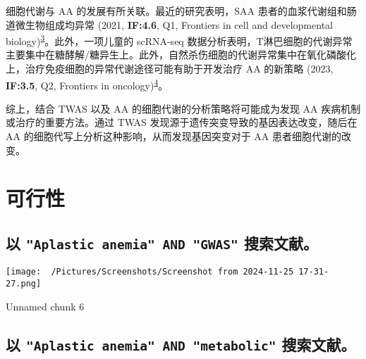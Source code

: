 \documentclass[
]{article}
\begin{document}
细胞代谢与 AA 的发展有所关联。最近的研究表明，SAA 患者的血浆代谢组和肠道微生物组成均异常 (2021, \textbf{IF:4.6}, Q1, Frontiers in cell and developmental biology)\textsuperscript{\protect\hyperlink{ref-Plasma_Metabolo_Shao_2021}{3}}。此外，一项儿童的 scRNA-seq 数据分析表明，T淋巴细胞的代谢异常主要集中在糖酵解/糖异生上。此外，自然杀伤细胞的代谢异常集中在氧化磷酸化上，治疗免疫细胞的异常代谢途径可能有助于开发治疗 AA 的新策略 (2023, \textbf{IF:3.5}, Q2, Frontiers in oncology)\textsuperscript{\protect\hyperlink{ref-Single_cell_RNA_Zhou_2023}{4}}。

综上，结合 TWAS 以及 AA 的细胞代谢的分析策略将可能成为发现 AA 疾病机制或治疗的重要方法。通过 TWAS 发现源于遗传突变导致的基因表达改变，随后在 AA 的细胞代写上分析这种影响，从而发现基因突变对于 AA 患者细胞代谢的改变。

\hypertarget{methods}{%
\section{可行性}\label{methods}}

\hypertarget{ux4ee5-aplastic-anemia-and-gwas-ux641cux7d22ux6587ux732e}{%
\subsection{\texorpdfstring{以 \texttt{"Aplastic\ anemia"\ AND\ "GWAS"} 搜索文献。}{以 "Aplastic anemia" AND "GWAS" 搜索文献。}}\label{ux4ee5-aplastic-anemia-and-gwas-ux641cux7d22ux6587ux732e}}

\begin{center}\vspace{1.5cm}\end{center}
\def\@captype{figure}
\begin{center}
\texttt{[image: ~/Pictures/Screenshots/Screenshot from 2024-11-25 17-31-27.png]}
\caption{Unnamed chunk 6}\label{fig:unnamed-chunk-6}
\end{center}

\begin{center}\vspace{1.5cm}\end{center}

\hypertarget{ux4ee5-aplastic-anemia-and-metabolic-ux641cux7d22ux6587ux732e}{%
\subsection{\texorpdfstring{以 \texttt{"Aplastic\ anemia"\ AND\ "metabolic"} 搜索文献。}{以 "Aplastic anemia" AND "metabolic" 搜索文献。}}\label{ux4ee5-aplastic-anemia-and-metabolic-ux641cux7d22ux6587ux732e}}
\end{document}
